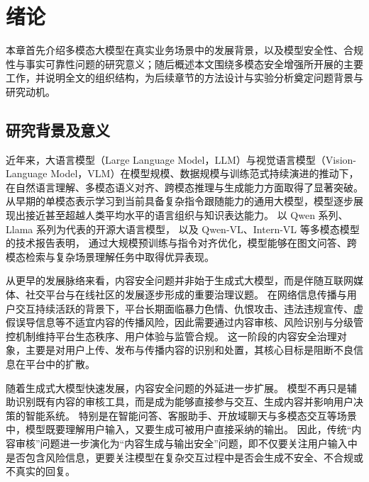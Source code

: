 
\chapter{绪论}

本章首先介绍多模态大模型在真实业务场景中的发展背景，以及模型安全性、合规性与事实可靠性问题的研究意义；随后概述本文围绕多模态安全增强所开展的主要工作，并说明全文的组织结构，为后续章节的方法设计与实验分析奠定问题背景与研究动机。

\section{研究背景及意义}
近年来，大语言模型（Large Language Model，LLM）与视觉语言模型（Vision-Language Model，VLM）在模型规模、数据规模与训练范式持续演进的推动下，
在自然语言理解、多模态语义对齐、跨模态推理与生成能力方面取得了显著突破\supercite{DBLP:journals/corr/abs-2001-08361, wei2022emergentabilitieslargelanguage}。
从早期的单模态表示学习到当前具备复杂指令跟随能力的通用大模型，模型逐步展现出接近甚至超越人类平均水平的语言组织与知识表达能力\supercite{DBLP:conf/nips/BrownMRSKDNSSAA20}。
以 Qwen 系列、Llama 系列为代表的开源大语言模型\supercite{Qwen3-Technical-Report, yang2025qwen3, kassianik2025llama}，
以及 Qwen-VL、Intern-VL 等多模态模型的技术报告表明\supercite{DBLP:journals/corr/abs-2312-14238, DBLP:journals/corr/abs-2508-18265, DBLP:journals/corr/abs-2504-10479}，
通过大规模预训练与指令对齐优化，模型能够在图文问答、跨模态检索与复杂场景理解任务中取得优异表现。

从更早的发展脉络来看，内容安全问题并非始于生成式大模型，而是伴随互联网媒体、社交平台与在线社区的发展逐步形成的重要治理议题。
在网络信息传播与用户交互持续活跃的背景下，平台长期面临暴力色情、仇恨攻击、违法违规宣传、虚假误导信息等不适宜内容的传播风险，因此需要通过内容审核、风险识别与分级管控机制维持平台生态秩序、用户体验与监管合规。
这一阶段的内容安全治理对象，主要是对用户上传、发布与传播内容的识别和处置，其核心目标是阻断不良信息在平台中的扩散。

随着生成式大模型快速发展，内容安全问题的外延进一步扩展。
模型不再只是辅助识别既有内容的审核工具，而是成为能够直接参与交互、生成内容并影响用户决策的智能系统。
特别是在智能问答、客服助手、开放域聊天与多模态交互等场景中，模型既要理解用户输入，又要生成可被用户直接采纳的输出。
因此，传统“内容审核”问题进一步演化为“内容生成与输出安全”问题，即不仅要关注用户输入中是否包含风险信息，更要关注模型在复杂交互过程中是否会生成不安全、不合规或不真实的回复。

